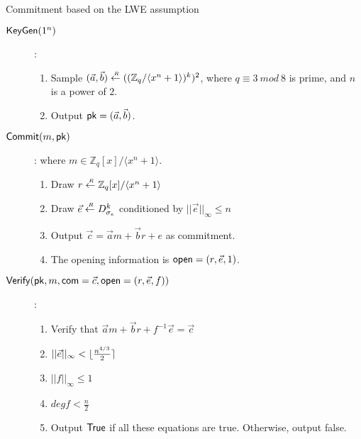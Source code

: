 \begin{section}{Commitment based on the LWE assumption~\cite{DBLP:conf/esorics/BenhamoudaKLP15}}

\begin{description}
\item[$\boldmath{{\mathsf{KeyGen}}}(1^n)$]:
  \begin{enumerate}
  \item Sample $(\vec{a}, \vec{b}) \stackrel{{\scriptscriptstyle \mkern4mu R}}{\gets} ((\mathbb{Z}_q/\langle x^n + 1\rangle)^k)^2$, where $q \equiv 3~mod~8$ is prime, and $n$ is a power of $2$.
  \item Output $ \mathsf{pk} = (\vec{a}, \vec{b})$.
  \end{enumerate}

\item[$\boldmath{{\mathsf{Commit}}}(m, \mathsf{pk})$]: where $m \in \mathbb{Z}_q[x]/\langle x^n + 1 \rangle$.
  \begin{enumerate}
  \item Draw $r \stackrel{{\scriptscriptstyle \mkern4mu R}}{\gets} \mathbb{Z}_q[x]/\langle x^n +1 \rangle$ 
  \item Draw $\vec{e} \stackrel{{\scriptscriptstyle \mkern4mu R}}{\gets} D_{\sigma_e}^k$ conditioned by $||\vec{e}||_{\infty} \leq n$
  \item Output $\vec{c} = \vec{a}m + \vec{b}r + e$ as commitment.
  \item The opening information is $\mathsf{open} = (r, \vec{e},1)$.
  \end{enumerate}

\item[$\boldmath{{\mathsf{Verify}}}(\mathsf{pk}, m, \mathsf{com} = \vec{c}, \mathsf{open} = (r, \vec{e}, f))$]:
  \begin{enumerate}
  \item Verify that $\vec{a} m + \vec{b} r + f^{-1}\vec{e} = \vec{c}$
  \item $||\vec{e}||_{\infty} < \lfloor\frac{n^{4/3}}{2}\rceil$
  \item $||f||_{\infty} \leq 1$
  \item $deg f < \frac{n}{2}$
  \item Output $\mathsf{True}$ if all these equations are true. Otherwise, output false.
  \end{enumerate}
\end{description}

\end{section}